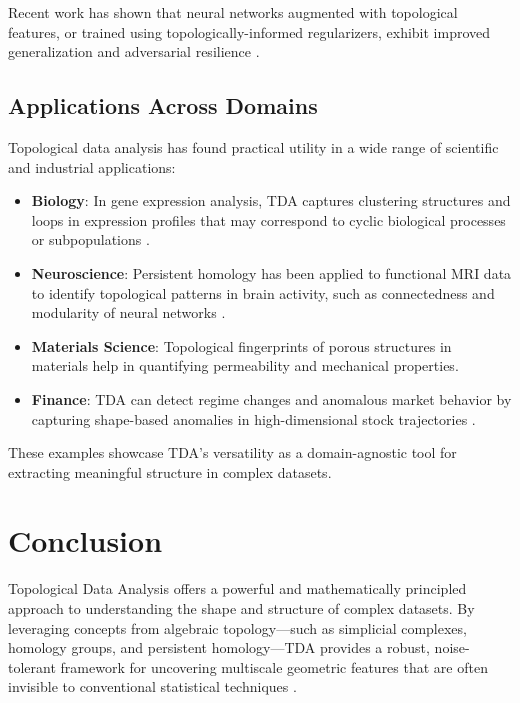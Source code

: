 \documentclass[9pt, twoside, twocolumn]{extarticle}
\begin{document}
        Recent work has shown that neural networks augmented with topological features, or trained using topologically-informed regularizers, exhibit improved generalization and adversarial resilience \cite{hofer2017deep, rieck2020tda}.

        \subsection*{Applications Across Domains}

        Topological data analysis has found practical utility in a wide range of scientific and industrial applications:

        \begin{itemize}
            \item \textbf{Biology}: In gene expression analysis, TDA captures clustering structures and loops in expression profiles that may correspond to cyclic biological processes or subpopulations \cite{carlsson2009topology}.
            \item \textbf{Neuroscience}: Persistent homology has been applied to functional MRI data to identify topological patterns in brain activity, such as connectedness and modularity of neural networks \cite{chazal2021introduction}.
            \item \textbf{Materials Science}: Topological fingerprints of porous structures in materials help in quantifying permeability and mechanical properties.
            \item \textbf{Finance}: TDA can detect regime changes and anomalous market behavior by capturing shape-based anomalies in high-dimensional stock trajectories \cite{rieck2020tda}.
        \end{itemize}

        These examples showcase TDA's versatility as a domain-agnostic tool for extracting meaningful structure in complex datasets.

\section*{Conclusion}

    Topological Data Analysis offers a powerful and mathematically principled approach to understanding the shape and structure of complex datasets. By leveraging concepts from algebraic topology—such as simplicial complexes, homology groups, and persistent homology—TDA provides a robust, noise-tolerant framework for uncovering multiscale geometric features that are often invisible to conventional statistical techniques \cite{carlsson2009topology, chazal2021introduction}.
\end{document}
